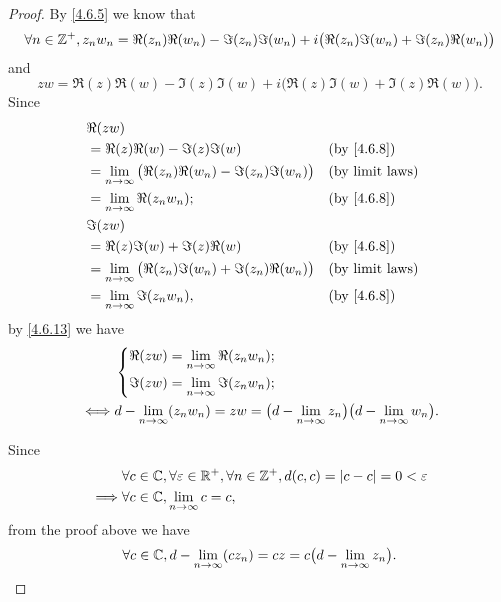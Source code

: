 \begin{proof}
  By \cref{4.6.5} we know that
  \[
    \forall n \in \mathbb{Z}^+, z_n w_n = \Re(z_n) \Re(w_n) - \Im(z_n) \Im(w_n) + i \big(\Re(z_n) \Im(w_n) + \Im(z_n) \Re(w_n)\big)
  \]
  and
  \[
    z w = \Re(z) \Re(w) - \Im(z) \Im(w) + i \big(\Re(z) \Im(w) + \Im(z) \Re(w)\big).
  \]
  Since
  \begin{align*}
     & \Re(zw)                                                                                           \\
     & = \Re(z) \Re(w) - \Im(z) \Im(w)                                       &  & \by{4.6.8}             \\
     & = \lim_{n \to \infty} \big(\Re(z_n) \Re(w_n) - \Im(z_n) \Im(w_n)\big) &  & \text{(by limit laws)} \\
     & = \lim_{n \to \infty} \Re(z_n w_n);                                   &  & \by{4.6.8}             \\
     & \Im(zw)                                                                                           \\
     & = \Re(z) \Im(w) + \Im(z) \Re(w)                                       &  & \by{4.6.8}             \\
     & = \lim_{n \to \infty} \big(\Re(z_n) \Im(w_n) + \Im(z_n) \Re(w_n)\big) &  & \text{(by limit laws)} \\
     & = \lim_{n \to \infty} \Im(z_n w_n),                                   &  & \by{4.6.8}
  \end{align*}
  by \cref{4.6.13} we have
  \begin{align*}
         & \begin{dcases}
             \Re(zw) = \lim_{n \to \infty} \Re(z_n w_n); \\
             \Im(zw) = \lim_{n \to \infty} \Im(z_n w_n);
           \end{dcases}                                                                           \\
    \iff & d - \lim_{n \to \infty} (z_n w_n) = zw = \big(d - \lim_{n \to \infty} z_n\big) \big(d - \lim_{n \to \infty} w_n\big).
  \end{align*}

  Since
  \begin{align*}
             & \forall c \in \mathbb{C}, \forall \varepsilon \in \mathbb{R}^+, \forall n \in \mathbb{Z}^+, d(c, c) = \left\lvert c - c\right\rvert = 0 < \varepsilon \\
    \implies & \forall c \in \mathbb{C}, \lim_{n \to \infty} c = c,
  \end{align*}
  from the proof above we have
  \[
    \forall c \in \mathbb{C}, d - \lim_{n \to \infty} (c z_n) = cz = c \big(d - \lim_{n \to \infty} z_n\big).
  \]


\end{proof}
